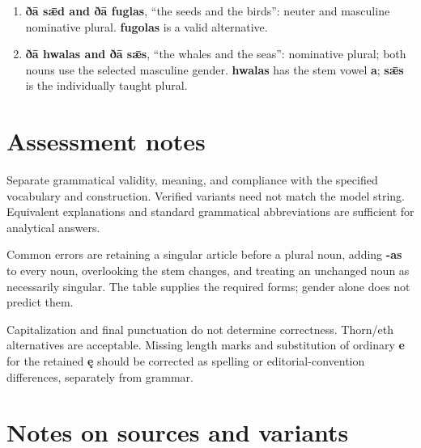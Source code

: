 \begin{enumerate}
\item[1.] \textbf{ðā sǣd and ðā fuglas}, “the seeds and the birds”: neuter and masculine nominative plural. \textbf{fugolas} is a valid alternative.
\item[2.] \textbf{ðā hwalas and ðā sǣs}, “the whales and the seas”: nominative plural; both nouns use the selected masculine gender. \textbf{hwalas} has the stem vowel \textbf{a}; \textbf{sǣs} is the individually taught plural.
\end{enumerate}


\section*{Assessment notes}


Separate grammatical validity, meaning, and compliance with the specified vocabulary and construction. Verified variants need not match the model string. Equivalent explanations and standard grammatical abbreviations are sufficient for analytical answers.


Common errors are retaining a singular article before a plural noun, adding \textbf{-as} to every noun, overlooking the stem changes, and treating an unchanged noun as necessarily singular. The table supplies the required forms; gender alone does not predict them.


Capitalization and final punctuation do not determine correctness. Thorn/\allowbreak{}eth alternatives are acceptable. Missing length marks and substitution of ordinary \textbf{e} for the retained \textbf{ę} should be corrected as spelling or editorial-convention differences, separately from grammar.


\begingroup\small
{}
\section*{Notes on sources and variants}


